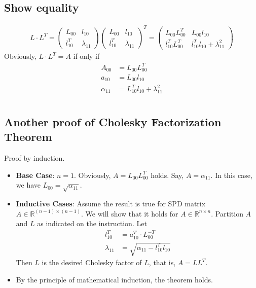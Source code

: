 \documentclass[11pt,a4paper]{article}
\begin{document}
\subsection{Show equality}
\newcommand{\LL}{\left( \begin{array}{cc}
            L_{00} & l_{10}  \\
            l_{10}^T & \lambda_{11} 
        \end{array} \right) }
\begin{align}
   L\cdot L^T =  \LL \LL^T = \left( \begin{array}{cc}
            L_{00} L_{00}^T & L_{00} l_{10}  \\
            l_{10}^T L_{00}^T & l_{10}^T l_{10} + \lambda_{11}^2
        \end{array} \right) 
\end{align} 
Obviously, $L \cdot L^T = A$ if only if 
\begin{equation}
\begin{aligned}
    A_{00} &= L_{00} L_{00}^T \\
    a_{10} &= L_{00} l_{10} \\
    \alpha_{11} &= L_{10}^T l_{10} + \lambda_{11} ^2
\end{aligned}
\end{equation}

\section{}
\subsection{Another proof of Cholesky Factorization Theorem}
Proof by induction.
\begin{itemize}
    \item \textbf{Base Case}: $n = 1$. Obviously, $A = L_{00} L_{00}^T$ holds. Say,
    $A = \alpha_{11}$. In this case, we have $L_{00} = \sqrt{\alpha_{11}}$. 
    \item \textbf{Inductive Cases}: Assume the result is true for SPD matrix $A
    \in \mathbb{R}^{(n-1)\times (n-1)}$. We will show that it holds for $A\in
    \mathbb{R}^{n\times n}$. Partition $A$ and $L$ as indicated on the
    instruction. Let 
    \begin{align} 
        l_{10}^T &= a_{10}^T \cdot L_{00}^{-T} \\
        \lambda_{11} &= \sqrt{\alpha_{11} - l_{10}^T l_{10}} 
    \end{align}
    Then $L$ is the desired Cholesky factor of $L$, that is, $A = L L^T$.
\item By the principle of mathematical induction, the theorem holds.
\end{itemize}
\end{document}
